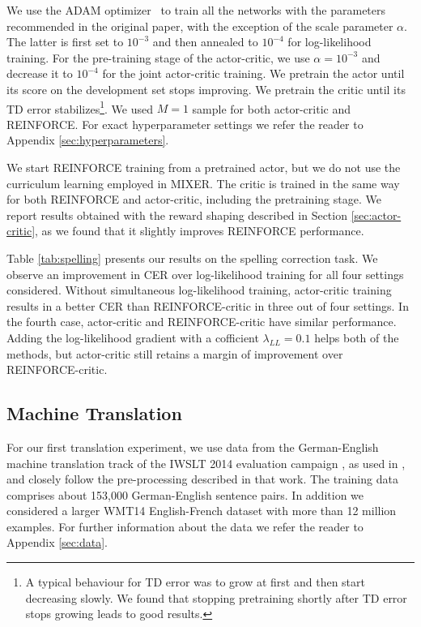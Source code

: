 \documentclass{article} \usepackage{iclr2017_conference,times}
\begin{document}
We use the ADAM optimizer~\citep{kingma2015method} to train all the networks
with the parameters recommended in the original paper, with the exception of
the scale parameter $\alpha$. The latter is first set to $10^{-3}$ and then
annealed to $10^{-4}$ for log-likelihood training. For the pre-training
stage of the actor-critic, we use $\alpha=10^{-3}$ and decrease it to
$10^{-4}$ for the joint actor-critic training. We pretrain the actor until
its score on the development set stops improving. We pretrain the critic until
its TD error stabilizes\footnote{A typical behaviour for TD error was to grow
at first and then start decreasing slowly.  We found that stopping pretraining
shortly after TD error stops growing leads to good results.}.  We used $M=1$
sample for both actor-critic and REINFORCE. For exact hyperparameter settings
we refer the reader to Appendix \ref{sec:hyperparameters}.

We start REINFORCE training from a pretrained actor, but we do
not use the curriculum learning employed in MIXER. The critic is trained in the
same way for both REINFORCE and actor-critic,
including the pretraining stage.
We report results obtained with the reward shaping described in Section
\ref{sec:actor-critic}, as we
found that it slightly improves REINFORCE performance.

Table \ref{tab:spelling} presents our results on the spelling correction task.
We observe an improvement in CER over log-likelihood training for all four settings considered.
Without simultaneous log-likelihood training,
actor-critic training results in a better CER than REINFORCE-critic 
in three out of four settings.
In the fourth case, actor-critic and REINFORCE-critic have similar
performance. Adding the log-likelihood gradient with a cofficient
$\lambda_{LL}=0.1$ helps both of the methods,
but actor-critic still retains a margin of improvement over REINFORCE-critic.
\subsection{Machine Translation}

For our first translation experiment, we use data from the German-English
machine translation track of the IWSLT 2014 evaluation campaign
\citep{cettolo2014report}, as used in \citet{ranzato2015sequence}, and closely follow the pre-processing described in
that work. The training data comprises about 153,000 German-English
sentence pairs. In addition we considered a larger WMT14 English-French dataset 
\cite{cho2014learning} with more than 12 million examples. For further information
about the data we refer the reader to Appendix \ref{sec:data}.
\end{document}
